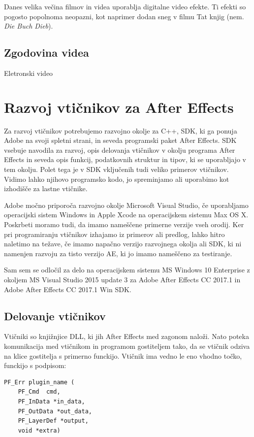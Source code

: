 \documentclass[a4paper, 12pt]{book}
\begin{document}
Danes velika večina filmov in videa uporablja digitalne video efekte. 
Ti efekti so pogosto popolnoma neopazni, kot naprimer dodan sneg v filmu Tat knjig (nem. {\it Die Buch Dieb}). %


\section{Zgodovina videa}

Eletronski video 






\chapter{Razvoj vtičnikov za After Effects}

Za razvoj vtičnikov potrebujemo razvojno okolje za C++, SDK, ki ga ponuja Adobe na svoji spletni strani, in seveda programski paket After Effects. 
SDK vsebuje navodila za razvoj, opis delovanja vtičnikov v okolju programa After Effects in seveda opis funkcij, podatkovnih struktur in tipov, ki se uporabljajo v tem okolju. 
Polet tega je v SDK vključenih tudi veliko primerov vtičnikov. 
Vidimo lahko njihovo programsko kodo, jo spreminjamo ali uporabimo kot izhodišče za lastne vtičnike.

Adobe močno priporoča razvojno okolje Microsoft Visual Studio, če uporabljamo operacijski sistem Windows in Apple Xcode na operacijskem sistemu Max OS X. 
Poskrbeti moramo tudi, da imamo nameščene primerne verzije vseh orodij. 
Ker pri programiranju vtičnikov izhajamo iz primerov ali predlog, lahko hitro naletimo na težave, če imamo napačno verzijo razvojnega okolja ali SDK, ki ni namenjen razvoju za tisto verzijo AE, ki jo imamo nameščeno za testiranje.

Sam sem se odločil za delo na operacijskem sistemu MS Windows 10 Enterprise z okoljem MS Visual Studio 2015 update 3 za Adobe After Effects CC 2017.1 in Adobe After Effects CC 2017.1 Win SDK. 


\section{Delovanje vtičnikov}
Vtičniki so knjižnjice DLL, ki jih After Effects med zagonom naloži. 
Nato poteka komunikacija med vtičnikom in programom gostiteljem tako, da se vtičnik odziva na klice gostitelja s primerno funckijo. 
Vtičnik ima vedno le eno vhodno točko, funckijo s podpisom:
\begin{verbatim}
PF_Err plugin_name (
    PF_Cmd	cmd,
    PF_InData *in_data,
    PF_OutData *out_data,
    PF_LayerDef *output,
    void *extra)
\end{verbatim}
\end{document}
